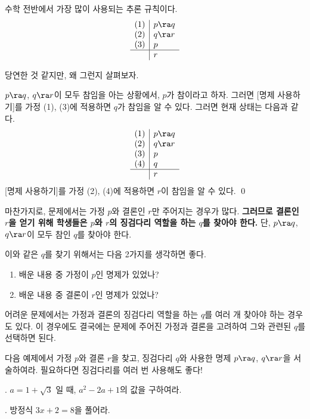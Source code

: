 수학 전반에서 가장 많이 사용되는 추론 규칙이다.
\[
    \begin{array}{c|l}
        (1) & p \ra q \\ (2) & q \ra r \\ (3) & p \\\hline & r
    \end{array}
\]

당연한 것 같지만, 왜 그런지 살펴보자.

\pf \(p \ra q\), \(q \ra r\)이 모두 참임을 아는 상황에서, \(p\)가 참이라고 하자. 그러면 [명제 사용하기]를 가정 (1), (3)에 적용하면 \(q\)가 참임을 알 수 있다. 그러면 현재 상태는 다음과 같다.
\[
    \begin{array}{c|l}
        (1) & p \ra q \\ (2) & q \ra r \\ (3) & p \\ (4) & q \\\hline & r
    \end{array}
\]
[명제 사용하기]를 가정 (2), (4)에 적용하면 \(r\)이 참임을 알 수 있다. \qed

마찬가지로, 문제에서는 가정 \(p\)와 결론인 \(r\)만 주어지는 경우가 많다. \textbf{그러므로 결론인 \(r\)을 얻기 위해 학생들은 \(p\)와 \(r\)의 징검다리 역할을 하는 \(q\)를 찾아야 한다.} 단, \(p \ra q\), \(q \ra r\)이 모두 참인 \(q\)를 찾아야 한다.

이와 같은 \(q\)를 찾기 위해서는 다음 2가지를 생각하면 좋다.
\begin{enumerate}
    \item 배운 내용 중 가정이 \(p\)인 명제가 있었나?
    \item 배운 내용 중 결론이 \(r\)인 명제가 있었나?
\end{enumerate}

어려운 문제에서는 가정과 결론의 징검다리 역할을 하는 \(q\)를 여러 개 찾아야 하는 경우도 있다. 이 경우에도 결국에는 문제에 주어진 가정과 결론을 고려하여 그와 관련된 \(q\)를 선택하면 된다.

\pagebreak

다음 예제에서 가정 \(p\)와 결론 \(r\)을 찾고, 징검다리 \(q\)와 사용한 명제 \(p \ra q\), \(q \ra r\)을 서술하여라. 필요하다면 징검다리를 여러 번 사용해도 좋다!

\ex. \(a = 1 + \sqrt{3}\) 일 때, \(a^2 - 2a + 1\)의 값을 구하여라.

\vspace*{350px}

\ex. 방정식 \(3x + 2 = 8\)을 풀어라.

\pagebreak

